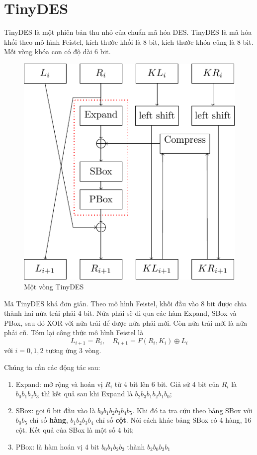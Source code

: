\chapter{TinyDES}

TinyDES là một phiên bản thu nhỏ của chuẩn mã hóa DES. TinyDES
là mã hóa khối theo mô hình Feistel, kích thước khối là 8 bit, kích
thước khóa cũng là 8 bit. Mỗi vòng khóa con có độ dài 6 bit.

\begin{figure}[ht]
    \centering
    \includegraphics{../pics/tinydes/blocky.pdf}
    \caption{Một vòng TinyDES}
\end{figure}

Mã TinyDES khá đơn giản. Theo mô hình Feistel, khối đầu vào 8 bit được chia thành
hai nửa trái phải 4 bit. Nửa phải sẽ đi qua các hàm Expand, SBox và PBox, sau đó
XOR với nửa trái để được nửa phải mới. Còn nửa trái mới là nửa phải cũ. Tóm lại 
công thức mô hình Feistel là
\[L_{i+1} = R_i, \quad R_{i+1} = F(R_i, K_i) \oplus L_i\]
với $i = 0, 1, 2$ tương ứng 3 vòng.

Chúng ta cần các động tác sau:

\begin{enumerate}
    \item Expand: mở rộng và hoán vị $R_i$ từ 4 bit lên 6 bit. Giả sử 4 bit
    của $R_i$ là $b_0 b_1 b_2 b_3$ thì kết quả sau khi Expand là $b_2 b_3 b_1
    b_2 b_1 b_0$;
    \item SBox: gọi 6 bit đầu vào là $b_0 b_1 b_2 b_3 b_4 b_5$. Khi đó ta tra
    cứu theo bảng SBox với $b_0 b_5$ chỉ số \textbf{hàng}, $b_1 b_2 b_3 b_4$ chỉ
    số \textbf{cột}. Nói cách khác bảng SBox có 4 hàng, 16 cột. Kết quả của SBox
    là một số 4 bit;
    \item PBox: là hàm hoán vị 4 bit $b_0 b_1 b_2 b_3$ thành $b_2 b_0 b_3 b_1$
\end{enumerate}

